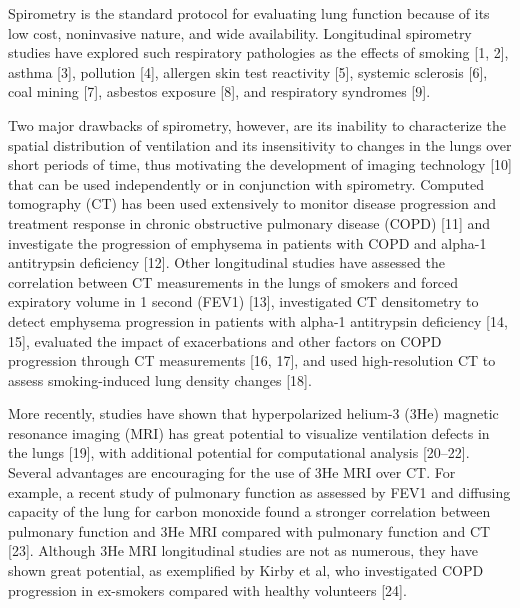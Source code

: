 \documentclass[11pt,]{article}
\begin{document}
Spirometry is the standard protocol for evaluating lung function because
of its low cost, noninvasive nature, and wide availability. Longitudinal
spirometry studies have explored such respiratory pathologies as the
effects of smoking {[}1, 2{]}, asthma {[}3{]}, pollution {[}4{]},
allergen skin test reactivity {[}5{]}, systemic sclerosis {[}6{]}, coal
mining {[}7{]}, asbestos exposure {[}8{]}, and respiratory syndromes
{[}9{]}.

Two major drawbacks of spirometry, however, are its inability to
characterize the spatial distribution of ventilation and its
insensitivity to changes in the lungs over short periods of time, thus
motivating the development of imaging technology {[}10{]} that can be
used independently or in conjunction with spirometry. Computed
tomography (CT) has been used extensively to monitor disease progression
and treatment response in chronic obstructive pulmonary disease (COPD)
{[}11{]} and investigate the progression of emphysema in patients with
COPD and alpha-1 antitrypsin deficiency {[}12{]}. Other longitudinal
studies have assessed the correlation between CT measurements in the
lungs of smokers and forced expiratory volume in 1 second (FEV1)
{[}13{]}, investigated CT densitometry to detect emphysema progression
in patients with alpha-1 antitrypsin deficiency {[}14, 15{]}, evaluated
the impact of exacerbations and other factors on COPD progression
through CT measurements {[}16, 17{]}, and used high-resolution CT to
assess smoking-induced lung density changes {[}18{]}.

More recently, studies have shown that hyperpolarized helium-3 (3He)
magnetic resonance imaging (MRI) has great potential to visualize
ventilation defects in the lungs {[}19{]}, with additional potential for
computational analysis {[}20--22{]}. Several advantages are encouraging
for the use of 3He MRI over CT. For example, a recent study of pulmonary
function as assessed by FEV1 and diffusing capacity of the lung for
carbon monoxide found a stronger correlation between pulmonary function
and 3He MRI compared with pulmonary function and CT {[}23{]}. Although
3He MRI longitudinal studies are not as numerous, they have shown great
potential, as exemplified by Kirby et al, who investigated COPD
progression in ex-smokers compared with healthy volunteers {[}24{]}.
\end{document}

